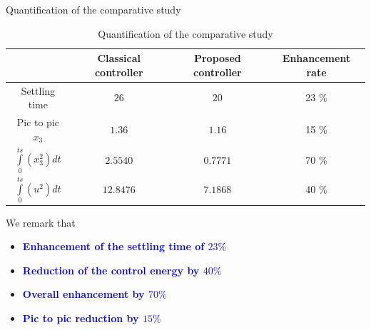 \documentclass[dvipsnames,mathserif]{beamer}
\begin{document}
{    \begin{frame}
      \footnotesize
      Quantification of the comparative study
      \begin{table}[h]
        \centering
        \begin{tabular}{|*{4}{c|}}
          \hline
  & Classical controller & Proposed controller & Enhancement rate \\
  \hline
          Settling time & $26$  &  $20$ & 23 \% \\
          \hline
          Pic to pic $x_3$  &$1.36$ & $1.16 $ &15 \% \\
          \hline
          $\int\limits_0^{ts}(x_3^2)dt $
                            & $2.5540$ & $0.7771$& 70 \% \\
                            \hline
          $ \int\limits_0^{ts}(u^2)dt$ & $12.8476$ & $7.1868$& 40 \% \\
          \hline
        \end{tabular}
        \caption{Quantification of the comparative study}
      \end{table}
      We remark that
      \begin{itemize}
        \item \textcolor{blue}{\textbf{Enhancement of the settling time of $23\%$}}
        \item \textcolor{blue}{\textbf{ Reduction of the control energy by $40\%$}}
        \item \textcolor{blue}{\textbf{ Overall enhancement by  $70\%$ }}
        \item \textcolor{blue}{\textbf{ Pic to pic reduction by  $15\%$}}
      \end{itemize}
    \end{frame}

}
\end{document}
